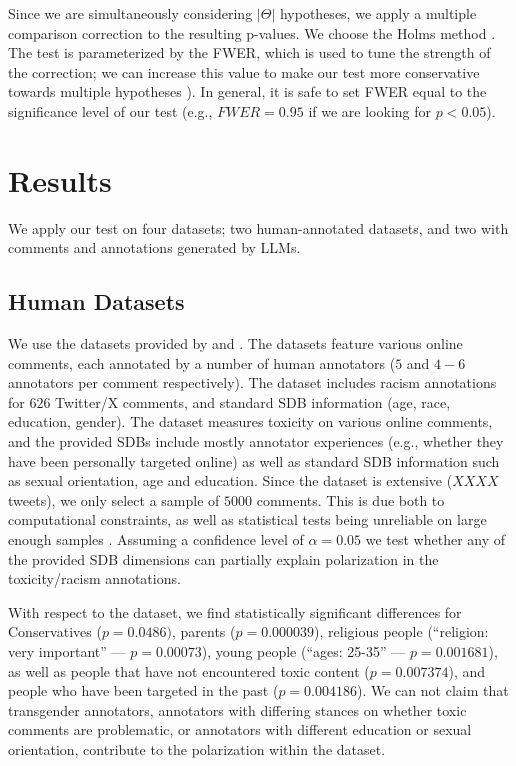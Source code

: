 \documentclass{article}
\begin{document}
Since we are simultaneously considering $\lvert \Theta \rvert$ hypotheses, we apply a multiple comparison correction to the resulting p-values. We choose the Holms method \parencite{holms}. The test is parameterized by the \ac{FWER}, which is used to tune the strength of the correction; we can increase this value to make our test more conservative towards multiple hypotheses \parencite{ChenFengYi2017}). In general, it is safe to set \ac{FWER} equal to the significance level of our test (e.g., $\textit{FWER} = 0.95$ if we are looking for $p < 0.05$).


\section{Results}
\label{sec:results}

We apply our test on four datasets; two human-annotated datasets, and two with comments and annotations generated by \acp{LLM}.

\subsection{Human Datasets}

We use the datasets provided by \textcite{kumar-et-al-2021} and \textcite{sap-etal-2022-annotators}. The datasets feature various online comments, each annotated by a number of human annotators ($5$ and $4-6$ annotators per comment respectively). The \textcite{sap-etal-2022-annotators} dataset includes racism annotations for $626$ Twitter/X comments, and standard \ac{SDB} information (age, race, education, gender). The \textcite{kumar-et-al-2021} dataset measures toxicity on various online comments, and the provided \acp{SDB} include mostly annotator experiences (e.g., whether they have been personally targeted online) as well as standard \ac{SDB} information such as sexual orientation, age and education. Since the dataset is extensive ($XXXX$ tweets), we only select a sample of $5000$ comments. This is due both to computational constraints, as well as statistical tests being unreliable on large enough samples \cite{trafimow2018manipulating}. Assuming a confidence level of $\alpha=0.05$ we test whether any of the provided \ac{SDB} dimensions can partially explain polarization in the toxicity/racism annotations. 

With respect to the \textcite{kumar-et-al-2021} dataset, we find statistically significant differences for Conservatives ($p=0.0486)$, parents ($p=0.000039$), religious people (``religion: very important'' --- $p = 0.00073$), young people (``ages: 25-35'' --- $p = 0.001681$), as well as people that have not encountered toxic content ($p=0.007374$), and people who have been targeted in the past ($p=0.004186$). We can not claim that transgender annotators, annotators with differing stances on whether toxic comments are problematic, or annotators with different education or sexual orientation, contribute to the polarization within the dataset.
\end{document}
